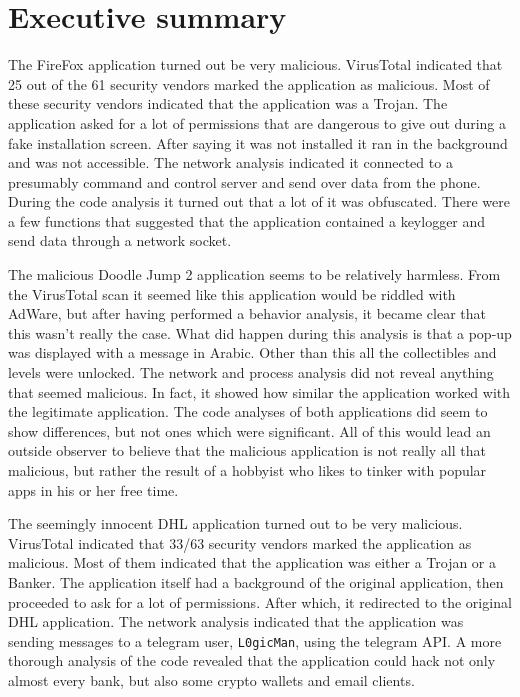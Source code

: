 \section*{Executive summary}
The FireFox application turned out be very malicious.
VirusTotal indicated that 25 out of the 61 security vendors marked the application as malicious.
Most of these security vendors indicated that the application was a Trojan.
The application asked for a lot of permissions that are dangerous to give out during a fake installation screen.
After saying it was not installed it ran in the background and was not accessible.
The network analysis indicated it connected to a presumably command and control server and send over data from the phone.
During the code analysis it turned out that a lot of it was obfuscated.
There were a few functions that suggested that the application contained a keylogger and send data through a network socket.

The malicious Doodle Jump 2 application seems to be relatively harmless.
From the VirusTotal scan it seemed like this application would be riddled with AdWare, but after having performed a behavior analysis, it became clear that this wasn’t really the case.
What did happen during this analysis is that a pop-up was displayed with a message in Arabic.
Other than this all the collectibles and levels were unlocked.
The network and process analysis did not reveal anything that seemed malicious.
In fact, it showed how similar the application worked with the legitimate application.
The code analyses of both applications did seem to show differences, but not ones which were significant.
All of this would lead an outside observer to believe that the malicious application is not really all that malicious, but rather the result of a hobbyist who likes to tinker with popular apps in his or her free time.

The seemingly innocent DHL application turned out to be very malicious.
VirusTotal indicated that 33/63 security vendors marked the application as malicious.
Most of them indicated that the application was either a Trojan or a Banker.
The application itself had a background of the original application, then proceeded to ask for a lot of permissions.
After which, it redirected to the original DHL application.
The network analysis indicated that the application was sending messages to a telegram user, \texttt{L0gicMan}, using the telegram API.
A more thorough analysis of the code revealed that the application could hack not only almost every bank, but also some crypto wallets and email clients.

